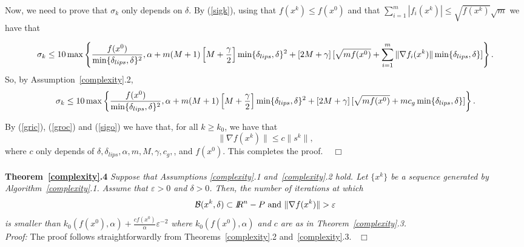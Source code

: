 \documentclass{article}
\newcommand{\R}         {I\!\!R}
\newcommand{\halmos}    {\hfill $\;\;\;\Box$\\}
\newcommand{\B}{{\cal B}}
\begin{document}
  




 

   Now, we need to prove that $\sigma_k$ only depends on $\delta$. 
  By (\ref{sigk}), using that $f(x^k) \leq f(x^0)$ and 
  that $\sum_{i=1}^m |f_i(x^k)| \leq \sqrt{f(x^k)} \sqrt{m}$ we have that

 \[
\sigma_k \leq 10 \max \left\{ \frac{f(x^0)}{\min\{\delta_{lips}, \delta\}^2},  \alpha +  
 m (M+1) \left[M + \frac{\gamma}{2} \right] \min\{\delta_{lips}, \delta\}^2   
           +   \left[2M+\gamma\right] [ \sqrt{m f(x^0)}  + \sum_{i=1}^m \|\nabla f_i(x^k)\|\min\{\delta_{lips}, \delta\}]\right\}.    \\
\]
So, by Assumption~\ref{complexity}.2,
  \begin{equation} \label{sigo}
\sigma_k \leq 10 \max \left\{ \frac{f(x^0)}{\min\{\delta_{lips}, \delta\}^2},  \alpha +  
 m (M+1) \left[M + \frac{\gamma}{2} \right] \min\{\delta_{lips}, \delta\}^2   
           +   \left[2M+\gamma\right] [ \sqrt{m f(x^0)}  + m  c_g \min\{\delta_{lips}, \delta\}]\right\}.    \\
\end{equation}

By (\ref{gric}), (\ref{groc}) and (\ref{sigo}) we have that, for all $k \geq k_0$, 
 we have that 
\[
\|\nabla f(x^k)\| \leq c \|s^k\|,
\]
where $c$ only depends of $\delta, \delta_{lips}, \alpha, m, M, \gamma, c_g,$, and $f(x^0)$. This completes the proof. \halmos\\

 \noindent
{\bf Theorem~\ref{complexity}.4} {\it Suppose that Assumptions \ref{complexity}.1 and~\ref{complexity}.2 hold. Let
  $\{x^k\}$ be a sequence generated by Algorithm~\ref{complexity}.1. Assume that $\varepsilon > 0$ and $\delta > 0$. 
   Then, the number of iterations at which 
\begin{equation} \label{epde}
\B(x^k, \delta) \subset \R^n - P \mbox{  and  } \|\nabla f(x^k)\| > \varepsilon
\end{equation}
is smaller than $k_0(f(x^0), \alpha) + \frac{c f(x^0)}{\alpha} \varepsilon^{-2}$ where
 $k_0(f(x^0), \alpha)$ and $c$ are as in Theorem~\ref{complexity}.3.}\\

\noindent
{\it Proof:} The proof follows straightforwardly from Theorems~\ref{complexity}.2 and~\ref{complexity}.3.\halmos\\
\end{document}
